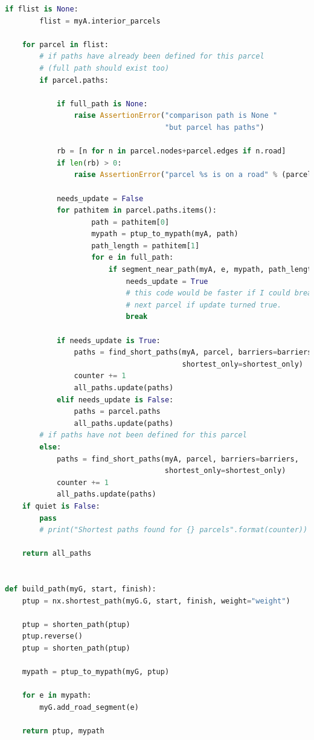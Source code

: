 \documentclass[10pt]{article}
\begin{document}
\begin{lstlisting}[language=Python]
    if flist is None:
        flist = myA.interior_parcels

    for parcel in flist:
        # if paths have already been defined for this parcel
        # (full path should exist too)
        if parcel.paths:

            if full_path is None:
                raise AssertionError("comparison path is None "
                                     "but parcel has paths")

            rb = [n for n in parcel.nodes+parcel.edges if n.road]
            if len(rb) > 0:
                raise AssertionError("parcel %s is on a road" % (parcel))

            needs_update = False
            for pathitem in parcel.paths.items():
                    path = pathitem[0]
                    mypath = ptup_to_mypath(myA, path)
                    path_length = pathitem[1]
                    for e in full_path:
                        if segment_near_path(myA, e, mypath, path_length):
                            needs_update = True
                            # this code would be faster if I could break to
                            # next parcel if update turned true.
                            break

            if needs_update is True:
                paths = find_short_paths(myA, parcel, barriers=barriers,
                                         shortest_only=shortest_only)
                counter += 1
                all_paths.update(paths)
            elif needs_update is False:
                paths = parcel.paths
                all_paths.update(paths)
        # if paths have not been defined for this parcel
        else:
            paths = find_short_paths(myA, parcel, barriers=barriers,
                                     shortest_only=shortest_only)
            counter += 1
            all_paths.update(paths)
    if quiet is False:
        pass
        # print("Shortest paths found for {} parcels".format(counter))

    return all_paths


def build_path(myG, start, finish):
    ptup = nx.shortest_path(myG.G, start, finish, weight="weight")

    ptup = shorten_path(ptup)
    ptup.reverse()
    ptup = shorten_path(ptup)

    mypath = ptup_to_mypath(myG, ptup)

    for e in mypath:
        myG.add_road_segment(e)

    return ptup, mypath



\end{lstlisting}
\end{document}
